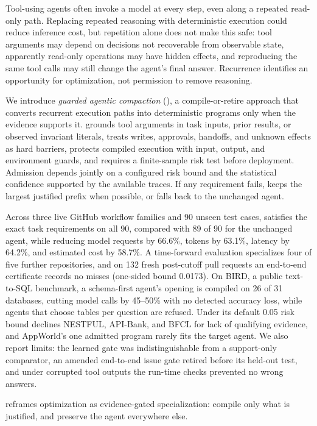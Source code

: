 Tool-using agents often invoke a model at every step, even along a repeated read-only
path. Replacing repeated reasoning with deterministic execution could reduce inference
cost, but repetition alone does not make this safe: tool arguments may depend on decisions
not recoverable from observable state, apparently read-only operations may have hidden
effects, and reproducing the same tool calls may still change the agent's final answer.
Recurrence identifies an opportunity for optimization, not permission to remove reasoning.

We introduce \emph{guarded agentic compaction} (\method), a compile-or-retire approach
that converts recurrent execution paths into deterministic programs only when the evidence
supports it. \method grounds tool arguments in task inputs, prior results, or observed invariant literals,
treats writes, approvals, handoffs, and unknown effects as hard barriers, protects
compiled execution with input, output, and environment guards, and requires a
finite-sample risk test before deployment. Admission depends jointly on a configured risk
bound and the statistical confidence supported by the available traces. If any requirement
fails, \method keeps the largest justified prefix when possible, or falls back to the
unchanged agent.

Across three live GitHub workflow families and 90 unseen test cases, \method satisfies the
exact task requirements on all 90, compared with 89 of 90 for the unchanged agent,
while reducing model requests by 66.6\%, tokens by 63.1\%, latency by 64.2\%, and estimated
cost by 58.7\%. A time-forward evaluation specializes four of five further repositories,
and on 132 fresh post-cutoff pull requests an end-to-end certificate records no misses
(one-sided bound 0.0173). On BIRD, a public text-to-SQL benchmark, a schema-first agent's
opening is compiled on 26 of 31 databases, cutting model calls by 45--50\% with no
detected accuracy loss, while agents that choose tables per question are refused. Under
its default 0.05 risk bound \method declines NESTFUL, API-Bank, and BFCL for lack of
qualifying evidence, and AppWorld's one admitted program rarely fits the target agent.
We also report limits: the learned gate was indistinguishable from a support-only
comparator, an amended end-to-end issue gate retired before its held-out test, and under
corrupted tool outputs the run-time checks prevented no wrong answers.

\method reframes optimization as evidence-gated specialization: compile only what is
justified, and preserve the agent everywhere else.
